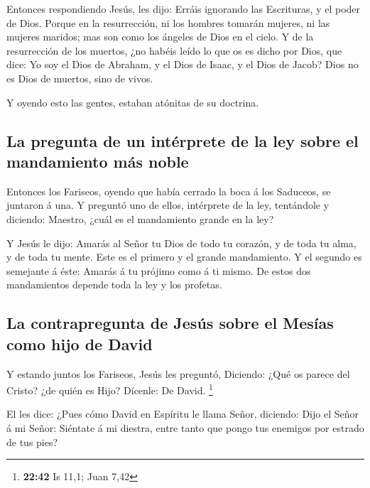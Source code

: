  Entonces respondiendo Jesús, les dijo: Erráis ignorando
las Escrituras, y el poder de Dios.  Porque en la
resurrección, ni los hombres tomarán mujeres, ni las mujeres maridos;
mas son como los ángeles de Dios en el cielo.  Y de la
resurrección de los muertos, ¿no habéis leído lo que os es dicho por
Dios, que dice:  Yo soy el Dios de Abraham, y el Dios de
Isaac, y el Dios de Jacob? Dios no es Dios de muertos, sino de vivos.

 Y oyendo esto las gentes, estaban atónitas de su
doctrina.

\hypertarget{la-pregunta-de-un-intuxe9rprete-de-la-ley-sobre-el-mandamiento-muxe1s-noble}{%
\subsection{La pregunta de un intérprete de la ley sobre el mandamiento
más
noble}\label{la-pregunta-de-un-intuxe9rprete-de-la-ley-sobre-el-mandamiento-muxe1s-noble}}

 Entonces los Fariseos, oyendo que había cerrado la boca
á los Saduceos, se juntaron á una.  Y preguntó uno de
ellos, intérprete de la ley, tentándole y diciendo: 
Maestro, ¿cuál es el mandamiento grande en la ley?

 Y Jesús le dijo: Amarás al Señor tu Dios de todo tu
corazón, y de toda tu alma, y de toda tu mente.  Este es
el primero y el grande mandamiento.  Y el segundo es
semejante á éste: Amarás á tu prójimo como á ti mismo. 
De estos dos mandamientos depende toda la ley y los profetas.

\hypertarget{la-contrapregunta-de-jesuxfas-sobre-el-mesuxedas-como-hijo-de-david}{%
\subsection{La contrapregunta de Jesús sobre el Mesías como hijo de
David}\label{la-contrapregunta-de-jesuxfas-sobre-el-mesuxedas-como-hijo-de-david}}

 Y estando juntos los Fariseos, Jesús les preguntó,
 Diciendo: ¿Qué os parece del Cristo? ¿de quién es Hijo?
Dícenle: De David. \footnote{\textbf{22:42} Is 11,1; Juan 7,42}

 El les dice: ¿Pues cómo David en Espíritu le llama
Señor, diciendo:  Dijo el Señor á mi Señor: Siéntate á mi
diestra, entre tanto que pongo tus enemigos por estrado de tus pies?

